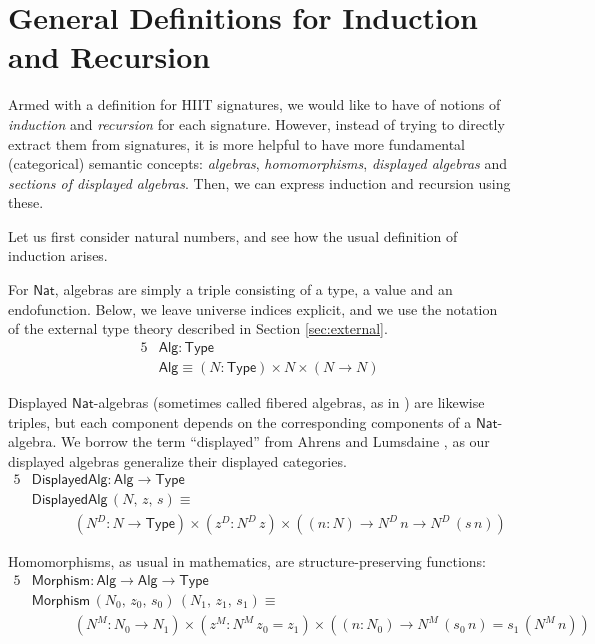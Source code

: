\documentclass[dvipsnames]{lmcs} %
\newcommand{\ra}{\rightarrow}
\newcommand{\Nat}{\mathsf{Nat}}
\newcommand{\1}{\mathsf{1}} \renewcommand{\Pr}{\mathsf{Pr}}
\newcommand{\Alg}{\mathsf{Alg}}
\newcommand{\DisplayedAlg}{\mathsf{DisplayedAlg}}
\newcommand{\Morphism}{\mathsf{Morphism}}
\theoremstyle{plain}\newtheorem{satz}[thm]{Satz} %
\begin{document}

\section{General Definitions for Induction and Recursion}
\label{sec:general}

Armed with a definition for HIIT signatures, we would like to have of notions of
\emph{induction} and \emph{recursion} for each signature. However, instead of
trying to directly extract them from signatures, it is more helpful to have more
fundamental (categorical) semantic concepts: \emph{algebras},
\emph{homomorphisms}, \emph{displayed algebras} and \emph{sections of displayed
  algebras}. Then, we can express induction and recursion using these.

Let us first consider natural numbers, and see how the usual definition of
induction arises.

For $\Nat$, algebras are simply a triple consisting of a type, a value and an
endofunction. Below, we leave universe indices explicit, and we use the notation
of the external type theory described in Section \ref{sec:external}.
\begin{alignat*}{5}
& \Alg : \mathsf{Type} \\
& \Alg \equiv (N : \mathsf{Type}) \times N \times (N \ra N)
\end{alignat*}

\noindent Displayed $\Nat$-algebras (sometimes called fibered algebras, as in
\cite{sojakova}) are likewise triples, but each component depends on the
corresponding components of a $\Nat$-algebra. We borrow the term ``displayed''
from Ahrens and Lumsdaine \cite{displayedCategories}, as our displayed algebras
generalize their displayed categories.
\begin{alignat*}{5}
& \DisplayedAlg : \Alg \ra \mathsf{Type} && \\
& \DisplayedAlg\,(N,\,z,\,s) \equiv && \\
&  \hspace{3em} (N^D : N \ra \mathsf{Type})\times (z^D : N^D\,z)\times ((n : N)\ra N^D\,n\ra N^D\,(s\,n))
\end{alignat*}

\noindent  Homomorphisms, as usual in mathematics, are structure-preserving functions:
\begin{alignat*}{5}
& \Morphism : \Alg \ra \Alg \ra \mathsf{Type} && \\
& \Morphism\,(N_0,\,z_0,\,s_0)\,(N_1,\,z_1,\,s_1) \equiv && \\
&  \hspace{3em} (N^M : N_0 \ra N_1)\times (z^M : N^M\,z_0 = z_1)\times ((n : N_0)\ra N^M\,(s_0\,n) = s_1\,(N^M\,n))
\end{alignat*}
\end{document}
